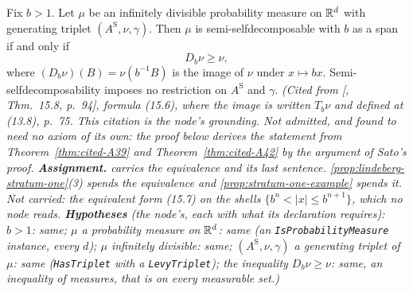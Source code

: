 \begin{theorem}
\label{thm:cited-A44}
\leanok
{}
Fix $b > 1$. Let $\mu$ be an infinitely divisible probability measure on $\mathbb{R}^d$ with generating
triplet $(A^{\mathrm S}, \nu, \gamma)$. Then $\mu$ is semi-selfdecomposable with $b$ as a span if and only if
\[
  D_b\nu \ge \nu ,
\]
where $(D_b\nu)(B) = \nu(b^{-1}B)$ is the image of $\nu$ under $x \mapsto bx$. Semi-selfdecomposability
imposes no restriction on $A^{\mathrm S}$ and $\gamma$.
\statusA\quad{}\quad\emph{(Cited from [, Thm.~15.8, p.~94], formula
(15.6), where the image is written $T_b\nu$ and defined at (13.8), p.~75. This citation is the
node's grounding. Not admitted, and found to need no axiom of its own: the proof below derives
the statement from Theorem~\ref{thm:cited-A39} and Theorem~\ref{thm:cited-A42} by the argument of Sato's proof.
\textbf{Assignment.}  carries the
equivalence and its last sentence. \ref{prop:lindeberg-stratum-one}(3) spends the equivalence
and \ref{prop:stratum-one-example} spends it. Not carried: the
equivalent form (15.7) on the shells $\{b^n < |x| \le b^{n+1}\}$, which no node reads.
\textbf{Hypotheses} (the node's, each with what its declaration requires): $b > 1$: same; $\mu$ a
probability measure on $\mathbb{R}^d$: same (an \texttt{IsProbabilityMeasure} instance, every $d$); $\mu$
infinitely divisible: same; $(A^{\mathrm S}, \nu, \gamma)$ a generating triplet of $\mu$: same
(\texttt{HasTriplet} with a \texttt{LevyTriplet}); the inequality $D_b\nu \ge \nu$: same, an
inequality of measures, that is on every measurable set.)}
\end{theorem}

